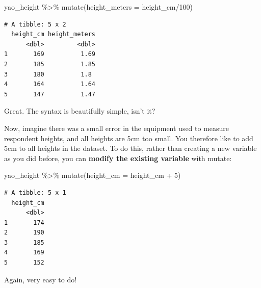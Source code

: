 \documentclass[
  letterpaper,
  DIV=11,
  numbers=noendperiod]{scrreprt}
\newenvironment{Shaded}{\begin{snugshade}}{\end{snugshade}}
\newcommand{\AttributeTok}[1]{\textcolor[rgb]{0.40,0.45,0.13}{#1}}
\newcommand{\DecValTok}[1]{\textcolor[rgb]{0.68,0.00,0.00}{#1}}
\newcommand{\FunctionTok}[1]{\textcolor[rgb]{0.28,0.35,0.67}{#1}}
\newcommand{\NormalTok}[1]{\textcolor[rgb]{0.00,0.23,0.31}{#1}}
\newcommand{\SpecialCharTok}[1]{\textcolor[rgb]{0.37,0.37,0.37}{#1}}
\begin{document}
\begin{Shaded}
\begin{Highlighting}[]
\NormalTok{yao\_height }\SpecialCharTok{\%\textgreater{}\%} 
  \FunctionTok{mutate}\NormalTok{(}\AttributeTok{height\_meters =}\NormalTok{ height\_cm}\SpecialCharTok{/}\DecValTok{100}\NormalTok{)}
\end{Highlighting}
\end{Shaded}

\begin{verbatim}
# A tibble: 5 x 2
  height_cm height_meters
      <dbl>         <dbl>
1       169          1.69
2       185          1.85
3       180          1.8 
4       164          1.64
5       147          1.47
\end{verbatim}

Great. The syntax is beautifully simple, isn't it?

Now, imagine there was a small error in the equipment used to measure
respondent heights, and all heights are 5cm too small. You therefore
like to add 5cm to all heights in the dataset. To do this, rather than
creating a new variable as you did before, you can \textbf{modify the
existing variable} with mutate:

\begin{Shaded}
\begin{Highlighting}[]
\NormalTok{yao\_height }\SpecialCharTok{\%\textgreater{}\%} 
  \FunctionTok{mutate}\NormalTok{(}\AttributeTok{height\_cm =}\NormalTok{ height\_cm }\SpecialCharTok{+} \DecValTok{5}\NormalTok{)}
\end{Highlighting}
\end{Shaded}

\begin{verbatim}
# A tibble: 5 x 1
  height_cm
      <dbl>
1       174
2       190
3       185
4       169
5       152
\end{verbatim}

Again, very easy to do!
\end{document}
